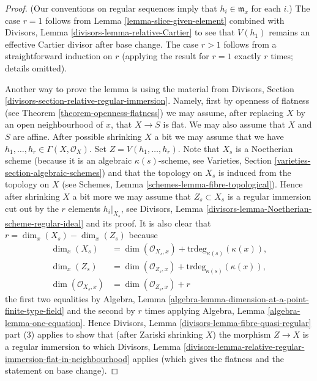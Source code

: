 \begin{proof}
(Our conventions on regular sequences imply that $h_i \in \mathfrak m_x$
for each $i$.) The case $r = 1$ follows from
Lemma \ref{lemma-slice-given-element}
combined with
Divisors, Lemma \ref{divisors-lemma-relative-Cartier}
to see that $V(h_1)$ remains an effective Cartier divisor after base change.
The case $r > 1$ follows from a straightforward induction on $r$ (applying
the result for $r = 1$ exactly $r$ times; details omitted).

\medskip\noindent
Another way to prove the lemma is using the material from
Divisors, Section \ref{divisors-section-relative-regular-immersion}.
Namely, first by openness of flatness (see
Theorem \ref{theorem-openness-flatness})
we may assume, after replacing $X$ by an
open neighbourhood of $x$, that $X \to S$ is flat.
We may also assume that $X$ and $S$ are affine.
After possible shrinking $X$ a bit we may assume that we have
$h_1, \ldots, h_r \in \Gamma(X, \mathcal{O}_X)$. Set
$Z = V(h_1, \ldots, h_r)$. Note that $X_s$ is a Noetherian scheme
(because it is an algebraic $\kappa(s)$-scheme, see
Varieties, Section \ref{varieties-section-algebraic-schemes})
and that the topology on $X_s$ is induced from the topology on $X$
(see
Schemes, Lemma \ref{schemes-lemma-fibre-topological}).
Hence after shrinking $X$ a bit more
we may assume that $Z_s \subset X_s$ is a regular immersion
cut out by the $r$ elements $h_i|_{X_s}$, see
Divisors, Lemma \ref{divisors-lemma-Noetherian-scheme-regular-ideal}
and its proof. It is also clear that $r = \dim_x(X_s) - \dim_x(Z_s)$ because
\begin{align*}
\dim_x(X_s) & = \dim(\mathcal{O}_{X_s, x}) +
\text{trdeg}_{\kappa(s)}(\kappa(x)), \\
\dim_x(Z_s) & = \dim(\mathcal{O}_{Z_s, x}) +
\text{trdeg}_{\kappa(s)}(\kappa(x)), \\
\dim(\mathcal{O}_{X_s, x}) & = \dim(\mathcal{O}_{Z_s, x}) + r
\end{align*}
the first two equalities by
Algebra, Lemma \ref{algebra-lemma-dimension-at-a-point-finite-type-field}
and the second by $r$ times applying
Algebra, Lemma \ref{algebra-lemma-one-equation}.
Hence
Divisors, Lemma \ref{divisors-lemma-fibre-quasi-regular} part (3)
applies to show that (after Zariski shrinking $X$) the morphism
$Z \to X$ is a regular immersion to which
Divisors, Lemma
\ref{divisors-lemma-relative-regular-immersion-flat-in-neighbourhood}
applies (which gives the flatness and the statement on base change).
\end{proof}

